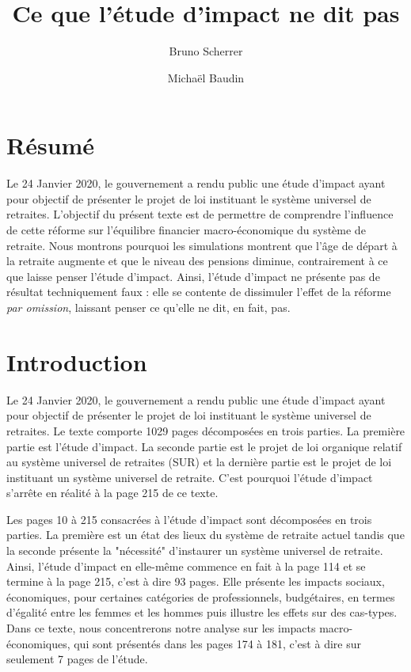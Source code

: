 \documentclass[10pt]{article}
\title{Ce que l'étude d'impact ne dit pas}
\author{Bruno Scherrer \and Michaël Baudin}
\begin{document}
\maketitle

\tableofcontents

\section{Résumé}

Le 24 Janvier 2020, le gouvernement a rendu public une 
étude d'impact ayant pour objectif de présenter le projet 
de loi instituant le système universel de retraites. 
L'objectif du présent texte est de permettre de comprendre 
l'influence de cette réforme sur l'équilibre financier macro-économique 
du système de retraite. 
Nous montrons pourquoi les simulations montrent que l'âge de départ à la 
retraite augmente et que le niveau des pensions diminue, contrairement à ce que laisse 
penser l'étude d'impact. 
Ainsi, l'étude d'impact ne présente pas de résultat techniquement faux : 
elle se contente de dissimuler l'effet de la réforme \emph{par omission}, 
laissant penser ce qu'elle ne dit, en fait, pas. 


\section{Introduction}

Le 24 Janvier 2020, le gouvernement a rendu public une 
étude d'impact \cite{EtudeImpact2020} ayant pour objectif de présenter le projet 
de loi instituant le système universel de retraites. 
Le texte comporte 1029 pages décomposées en trois parties. 
La première partie est l'étude d'impact. 
La seconde partie est le projet de loi organique relatif au système 
universel de retraites (SUR) et la dernière partie est le projet 
de loi instituant un système universel de retraite. 
C'est pourquoi l'étude d'impact s'arrête en réalité à la page 215 de ce 
texte. 

Les pages 10 à 215 consacrées à l'étude d'impact sont décomposées en trois parties. 
La première est un état des lieux du système de retraite actuel tandis que 
la seconde présente la "nécessité" d'instaurer un système universel de retraite. 
Ainsi, l'étude d'impact en elle-même commence en fait à la page 114 et se termine à la 
page 215, c'est à dire 93 pages.  
Elle présente les impacts sociaux, économiques, pour certaines catégories de professionnels, 
budgétaires, en termes d'égalité entre les femmes et les hommes puis illustre les 
effets sur des cas-types. 
Dans ce texte, nous concentrerons notre analyse sur les impacts macro-économiques, 
qui sont présentés dans les pages 174 à 181, c'est à dire sur seulement 7 pages de 
l'étude. 
\end{document}
